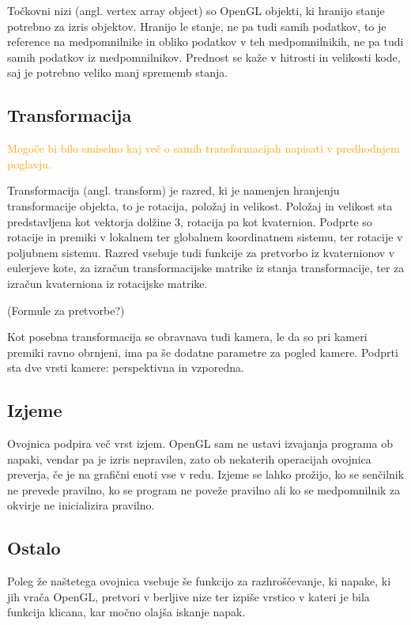 \documentclass[a4paper, 12pt]{book}
\begin{document}
Točkovni nizi (angl. vertex array object) so OpenGL objekti, ki hranijo stanje potrebno za izris objektov. Hranijo le stanje, ne pa tudi samih podatkov, to je reference na medpomnilnike in obliko podatkov v teh medpomnilnikih, ne pa tudi samih podatkov iz medpomnilnikov. Prednost se kaže v hitrosti in velikosti kode, saj je potrebno veliko manj sprememb stanja.

\subsection*{Transformacija}

\textcolor{orange}{Mogoče bi bilo smiselno kaj več o samih transformacijah napisati v predhodnjem poglavju.}

Transformacija (angl. transform) je razred, ki je namenjen hranjenju transformacije objekta, to je rotacija, položaj in velikost. Položaj in velikost sta predstavljena kot vektorja dolžine 3, rotacija pa kot kvaternion. Podprte so rotacije in premiki v lokalnem ter globalnem koordinatnem sistemu, ter rotacije v poljubnem sistemu. Razred vsebuje tudi funkcije za pretvorbo iz kvaternionov v eulerjeve kote, za izračun transformacijske matrike iz stanja transformacije, ter za izračun kvaterniona iz rotacijske matrike.

(Formule za pretvorbe?)

Kot posebna transformacija se obravnava tudi kamera, le da so pri kameri premiki ravno obrnjeni, ima pa še dodatne parametre za pogled kamere. Podprti sta dve vrsti kamere: perspektivna in vzporedna.
\subsection*{Izjeme}
Ovojnica podpira več vrst izjem. OpenGL sam ne ustavi izvajanja programa ob napaki, vendar pa je izris nepravilen, zato ob nekaterih operacijah ovojnica preverja, če je na grafični enoti vse v redu. Izjeme se lahko prožijo, ko se senčilnik ne prevede pravilno, ko se program ne poveže pravilno ali ko se medpomnilnik za okvirje ne inicializira pravilno.

\subsection*{Ostalo}

Poleg že naštetega ovojnica vsebuje še funkcijo za razhroščevanje, ki napake, ki jih vrača OpenGL, pretvori v berljive nize ter izpiše vrstico v kateri je bila funkcija klicana, kar močno olajša iskanje napak.
\end{document}
